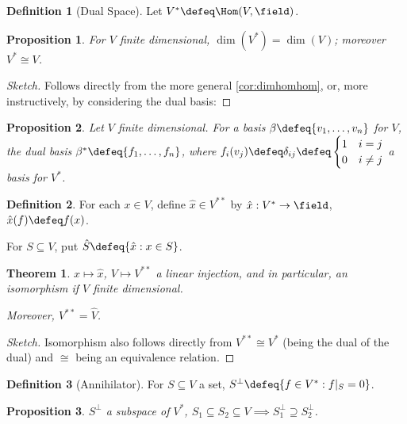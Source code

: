 \documentclass[12pt, oneside]{article}
\theoremstyle{definition}
\newtheorem{defn}{Definition}
\theoremstyle{plain}
\newtheorem{thm}{Theorem}
\newtheorem{prop}{Proposition}
\theoremstyle{remark}
\begin{document}
\begin{defn}[Dual Space]
  Let $V^\ast \defeq \Hom(V, \field)$.
\end{defn}
\begin{prop}
  For $V$ finite dimensional, $\dim(V^\ast) = \dim(V)$; moreover $V^\ast \cong V$.
\end{prop}
\begin{proof}[Sketch]
  Follows directly from the more general \cref{cor:dimhomhom}, or, more instructively, by considering the dual basis:
\end{proof}
\begin{prop}
  Let $V$ finite dimensional. For a basis $\beta \defeq \{v_1, \dots, v_n\}$ for $V$, the dual basis $\beta^\ast \defeq \{f_1, \dots, f_n\}$, where $f_i(v_j) \defeq \delta_{ij} \defeq \begin{cases}
    1 & i = j\\
    0 & i \neq j
  \end{cases}$ a basis for $V^\ast$.
\end{prop}

\begin{defn}
  For each $x \in V$, define $\hat{x} \in V^{\ast \ast}$ by $\hat{x} : V^\ast \to \field$, $\hat{x}(f) \defeq f(x)$.

  For $S \subseteq V$, put $\hat{S} \defeq \{\hat{x} : x \in S\}$.
\end{defn}

\begin{thm}
  $x \mapsto \hat{x}$, $V \mapsto V^{\ast \ast}$ a linear injection, and in particular, an isomorphism if $V$ finite dimensional.

  Moreover, $V^{\ast \ast} = \hat{V}$.
\end{thm}

\begin{proof}[Sketch]
  Isomorphism also follows directly from $V^{\ast \ast} \cong V^{\ast}$ (being the dual of the dual) and $\cong$ being an equivalence relation.
\end{proof}

\begin{defn}[Annihilator]
  For $S \subseteq V$ a set, $S^\perp \defeq \{f \in V^\ast : f\vert_S = 0\}$.
\end{defn}

\begin{prop}
  $S^\perp$ a subspace of $V^\ast$, $S_1 \subseteq S_2 \subseteq V \implies S_1^\perp \supseteq S_2^\perp$.
\end{prop}
\end{document}
